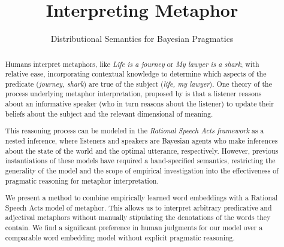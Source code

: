 \documentclass[OpenMind]{stjour}
\begin{document}
\title{Interpreting Metaphor}
\subtitle{Distributional Semantics for Bayesian Pragmatics} %
\author[]
	{}





\begin{abstract}

	Humans interpret metaphors, like \emph{Life is a journey} or \emph{My lawyer is a shark}, with relative ease, incorporating contextual knowledge to determine which aspects of the predicate (\emph{journey, shark}) are true of the subject (\emph{life, my lawyer}). One theory of the process underlying metaphor interpretation, proposed by \citet{grice} is that a listener reasons about an informative speaker (who in turn reasons about the listener) to update their beliefs about the subject and the relevant dimensional of meaning.

	This reasoning process can be modeled in the \emph{Rational Speech Acts framework} \citep{frank2012predicting} as a nested inference, where listeners and speakers are Bayesian agents who make inferences about the state of the world and the optimal utterance, respectively.
	However, previous instantiations of these models have required a hand-specified semantics, restricting the generality of the model and the scope of empirical investigation into the effectiveness of pragmatic reasoning for metaphor interpretation.

	We present a method to combine empirically learned word embeddings with a Rational Speech Acts model of metaphor. This allows us to interpret arbitrary predicative and adjectival metaphors without manually stipulating the denotations of the words they contain. We find a significant preference in human judgments for our model over a comparable word embedding model without explicit pragmatic reasoning.



\end{abstract}
\end{document}
